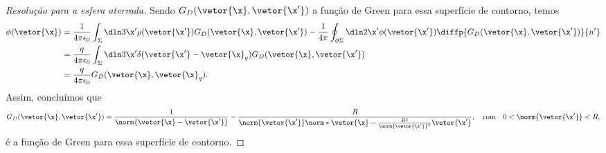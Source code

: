 \begin{proof}[Resolução para a esfera aterrada]
    Sendo \(G_D(\vetor{\x}, \vetor{\x'})\) a função de Green para essa superfície de contorno, temos
    \begin{align*}
        \phi(\vetor{\x}) &= \frac{1}{4\pi \epsilon_0}\int_{\Sigma} \dln3{\x'} \rho(\vetor{\x'})G_D(\vetor{\x}, \vetor{\x'}) - \frac1{4\pi}\oint_{\partial \Sigma}\dln2{\x'} \phi(\vetor{\x'})\diffp{G_D(\vetor{\x}, \vetor{\x'})}{n'}\\
                         &= \frac{q}{4\pi \epsilon_0} \int_{\Sigma} \dln3{\x'} \delta(\vetor{\x'}-\vetor{\x}_q)G_D(\vetor{\x}, \vetor{\x'})\\
                         &= \frac{q}{4\pi \epsilon_0} G_D(\vetor{\x}, \vetor{\x}_q).
    \end{align*}
    Assim, concluímos que
    \begin{equation*}
        G_D(\vetor{\x}, \vetor{\x'}) = \frac{1}{\norm{\vetor{\x} - \vetor{\x'}}} - \frac{R}{\norm{\vetor{\x'}}\norm*{\vetor{\x} - \frac{R^2}{\norm{\vetor{\x'}}^2}\vetor{\x'}}},
        \quad\text{com}\quad
        0 < \norm{\vetor{\x'}} < R,
    \end{equation*}
    é a função de Green para essa superfície de contorno.


\end{proof}
